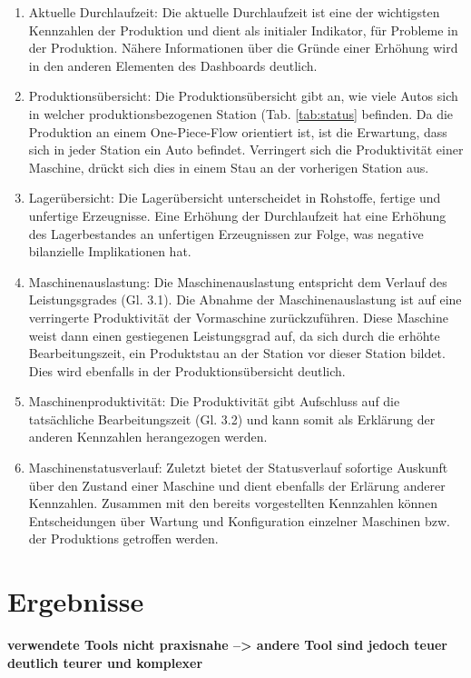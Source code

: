 \begin{enumerate}
    \item Aktuelle Durchlaufzeit: Die aktuelle Durchlaufzeit ist eine der wichtigsten Kennzahlen der Produktion und dient als initialer Indikator, für Probleme in der Produktion. Nähere Informationen über die Gründe einer Erhöhung wird in den anderen Elementen des Dashboards deutlich.
    \item Produktionsübersicht: Die Produktionsübersicht gibt an, wie viele Autos sich in welcher produktionsbezogenen Station (Tab. \ref{tab:status} befinden. Da die Produktion an einem One-Piece-Flow orientiert ist, ist die Erwartung, dass sich in jeder Station ein Auto befindet. Verringert sich die Produktivität einer Maschine, drückt sich dies in einem Stau an der vorherigen Station aus.
    \item Lagerübersicht: Die Lagerübersicht unterscheidet in Rohstoffe, fertige und unfertige Erzeugnisse. Eine Erhöhung der Durchlaufzeit hat eine Erhöhung des Lagerbestandes an unfertigen Erzeugnissen zur Folge, was negative bilanzielle Implikationen hat.
    \item Maschinenauslastung: Die Maschinenauslastung entspricht dem Verlauf des Leistungsgrades (Gl. 3.1). Die Abnahme der Maschinenauslastung ist auf eine verringerte Produktivität der Vormaschine zurückzuführen. Diese Maschine weist dann einen gestiegenen Leistungsgrad auf, da sich durch die erhöhte Bearbeitungszeit, ein Produktstau an der Station vor dieser Station bildet. Dies wird ebenfalls in der Produktionsübersicht deutlich.
    \item Maschinenproduktivität: Die Produktivität gibt Aufschluss auf die tatsächliche Bearbeitungszeit (Gl. 3.2) und kann somit als Erklärung der anderen Kennzahlen herangezogen werden.
    \item Maschinenstatusverlauf: Zuletzt bietet der Statusverlauf sofortige Auskunft über den Zustand einer Maschine und dient ebenfalls der Erlärung anderer Kennzahlen. Zusammen mit den bereits vorgestellten Kennzahlen können Entscheidungen über Wartung und Konfiguration einzelner Maschinen bzw. der Produktions getroffen werden.
\end{enumerate}
\section{Ergebnisse}
\textbf{verwendete Tools nicht praxisnahe --> andere Tool sind jedoch teuer deutlich teurer und komplexer}